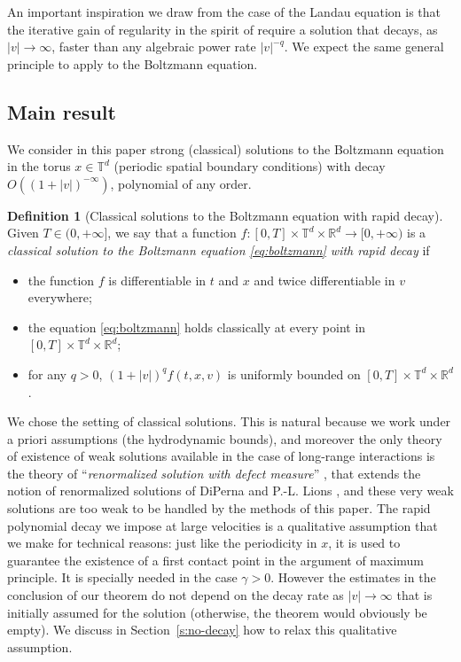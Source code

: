 \documentclass[JEP,XML,SOM,Unicode,NoFloatCountersInSection]{cedram}
\theoremstyle{plain}
\theoremstyle{definition}
\newtheorem{defn}[thm]{Definition}
\numberwithin{equation}{section}
\newcommand{\R}{\mathbb R}
\begin{document}
An important inspiration we draw from the case of the Landau equation
is that the iterative gain of regularity in the spirit of
\cite{henderson2017c} require a solution that decays, as
$|v| \to \infty$, faster than any algebraic power rate $|v|^{-q}$. We
expect the same general principle to apply to the Boltzmann
equation.

\subsection{Main result}

We consider in this paper strong (classical) solutions to the
Boltzmann equation in the torus $x \in \mathbb T^d$ (periodic spatial
boundary conditions) with decay $O((1+|v|)^{-\infty})$,
\ie polynomial of any order.

\begin{defn}[Classical solutions to the Boltzmann equation with rapid
decay] \label{d:solutions-rapid-decay} Given $T \in (0,+\infty]$, we
say that a function
$f : [0,T] \times \mathbb T^d \times \R^d \to [0,+\infty)$ is a
\emph{classical solution to the Boltzmann equation
\eqref{eq:boltzmann} with rapid decay} if
\begin{itemize}
\item the function $f$ is differentiable in $t$ and $x$ and twice
differentiable in $v$ everywhere;
\item the equation \eqref{eq:boltzmann} holds classically at every
point in $[0,T] \times \mathbb T^d \times \R^d$;
\item for any $q>0$, $(1+|v|)^q f(t,x,v)$ is uniformly bounded on
$[0,T] \times \mathbb T^d \times \R^d$.
\end{itemize}
\end{defn}

We chose the setting of classical solutions. This is natural because
we work under a priori assumptions (the hydrodynamic bounds),
and moreover the only theory of existence of weak solutions available
in the case of long-range interactions is the theory of
``\emph{renormalized solution with defect measure}'' \cite{MR1857879},
that extends the notion of renormalized solutions of DiPerna and
P.-L. Lions \cite{MR1014927}, and these very weak solutions are too
weak to be handled by the methods of this paper. The rapid polynomial
decay we impose at large velocities is a qualitative assumption that
we make for technical reasons: just like the periodicity in $x$, it is
used to guarantee the existence of a first contact point in the
argument of maximum principle. It is specially needed in the case
$\gamma >0$. However the estimates in the conclusion of our theorem do
not depend on the decay rate as $|v| \to \infty$ that is initially
assumed for the solution (otherwise, the theorem would obviously be
empty). We discuss in Section~\ref{s:no-decay} how to relax this
qualitative assumption.
\end{document}
